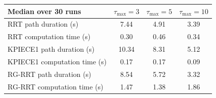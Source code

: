 \begin{tabular}{lccc}\toprule
Median over 30 runs & $\tau_{\max}=3$ & $\tau_{\max}=5$ & $\tau_{\max}=10$ \\ \midrule
RRT path duration (s) & 7.44 & 4.91 & 3.39 \\
RRT computation time (s) & 0.30 & 0.46 & 0.34 \\
KPIECE1 path duration (s) & 10.34 & 8.31 & 5.12 \\
KPIECE1 computation time (s) & 0.17 & 0.17 & 0.09 \\
RG-RRT path duration (s) & 8.54 & 5.72 & 3.32 \\
RG-RRT computation time (s) & 1.47 & 1.38 & 1.86 \\
\bottomrule\end{tabular}
